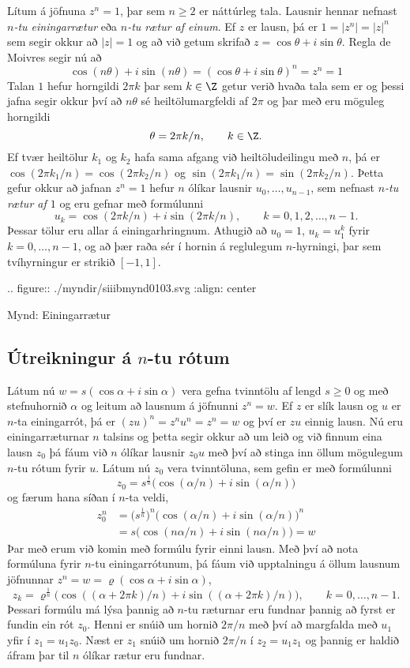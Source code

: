 Lítum á jöfnuna $z^n=1$, þar sem $n\geq 2$ er náttúrleg tala.
Lausnir hennar nefnast {\it $n$-tu einingarrætur} eða {\it $n$-tu
rætur af einum}. 
Ef $z$ er lausn, þá er $1=|z^n|=|z|^n$ sem segir okkur
að $|z|=1$ og að við getum skrifað $z=\cos \theta+i\sin \theta$.
Regla de Moivres segir nú að 
$$
\cos (n\theta)+i\sin(n\theta)=(\cos \theta+i\sin \theta)^n=z^n=1
$$
Talan $1$ hefur horngildi $2\pi k$ þar sem  $k\in \Z$ getur verið
hvaða tala sem er 
og þessi jafna segir okkur því að 
$n\theta$ sé heiltölumargfeldi af $2\pi$ og þar með eru möguleg
horngildi
$$
\theta=2\pi k/n, \qquad k\in \Z.
$$
Ef tvær heiltölur $k_1$ og $k_2$ hafa sama afgang við heiltöludeilingu
með $n$, þá er $\cos(2\pi k_1/n)=\cos(2\pi k_2/n)$
og $\sin(2\pi k_1/n)=\sin(2\pi k_2/n)$.  Þetta gefur okkur að 
jafnan $z^n=1$ hefur $n$ ólíkar lausnir $u_0,\dots,u_{n-1}$, 
sem nefnast {\it $n$-tu rætur af $1$} og eru gefnar með formúlunni
$$
u_k=\cos(2\pi k/n)+i\sin(2\pi k/n), \qquad k=0,1,2,\dots,n-1.
$$
Þessar tölur eru allar á einingarhringnum.  Athugið 
að $u_0=1$,  $u_k=u_1^k$ fyrir $k=0,\dots,n-1$,  og að 
þær raða sér í hornin á reglulegum $n$-hyrningi, þar sem tvíhyrningur 
er strikið $[-1,1]$.
\begin{center}
.. figure:: ./myndir/siiibmynd0103.svg
    :align: center

    Mynd: Einingarrætur


\end{center}


\subsection*{Útreikningur á $n$-tu rótum}

Látum nú $w=s(\cos\alpha+i\sin \alpha)$ vera gefna tvinntölu
af lengd $s\geq 0$ og með stefnuhornið $\alpha$
og leitum að lausnum á jöfnunni $z^n=w$.  Ef $z$ er slík lausn
og $u$ er $n$-ta einingarrót, þá er $(zu)^n=z^nu^n=z^n=w$ og því er 
$zu$ einnig lausn.  Nú eru einingarræturnar $n$ talsins og þetta segir
okkur að um leið og við finnum eina lausn $z_0$ þá fáum við $n$ ólíkar
lausnir $z_0u$ með því að stinga inn öllum mögulegum $n$-tu rótum
fyrir $u$.  
Látum nú $z_0$ vera tvinntöluna, sem gefin er með formúlunni
$$
z_0=s^{\frac 1n}\big(\cos(\alpha/n)+i\sin(\alpha/n)\big)
$$ 
og færum hana síðan í $n$-ta veldi,
\begin{align*}
z_0^n &=\big(s^{\frac 1n}\big)^n\big(\cos(\alpha/n)+i\sin(\alpha/n)\big)^n \\
 & =s\big(\cos(n\alpha/n)+i\sin(n\alpha/n)\big)=w
\end{align*}
Þar með erum við komin með formúlu fyrir einni  lausn. 
Með því að nota formúluna fyrir $n$-tu einingarrótunum, þá
fáum við upptalningu á öllum lausnum jöfnunnar
$z^n=w=\varrho(\cos\alpha+i\sin \alpha)$,
$$
z_k=\varrho^{\frac 1n}\big(\cos((\alpha+2\pi k)/n)+i\sin((\alpha+2\pi
k)/n)\big), \qquad k=0,\dots,n-1.
$$
Þessari formúlu má lýsa þannig að $n$-tu ræturnar eru fundnar þannig að
fyrst er fundin ein rót $z_0$.  Henni er snúið um hornið $2\pi/n$ 
með því að  margfalda með 
$u_1$ yfir í $z_1=u_1z_0$.  Næst er $z_1$ snúið um hornið $2\pi/n$
í $z_2=u_1z_1$ og þannig er haldið áfram þar til $n$ ólíkar rætur eru
fundnar.


